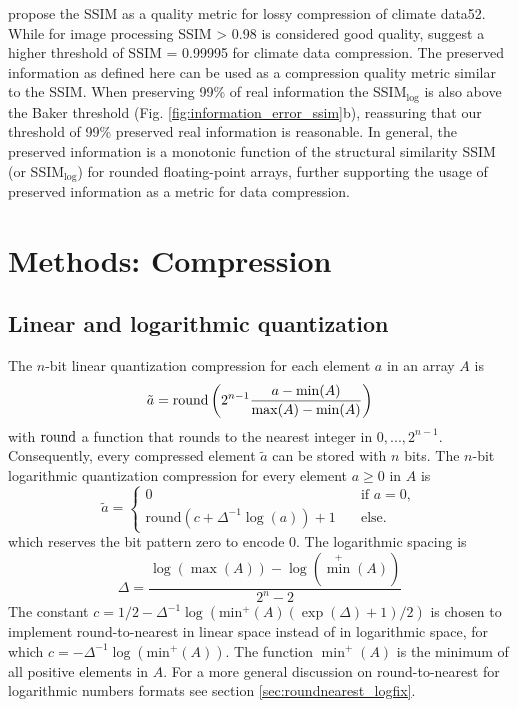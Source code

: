 \cite{Baker2019} propose the SSIM as a quality metric for lossy compression of climate data52. While for image processing
SSIM > 0.98 is considered good quality, \cite{Baker2019} suggest a higher threshold of SSIM = 0.99995 for climate data compression.
The preserved information as defined here can be used as a compression quality metric similar to the SSIM. When preserving 99\%
of real information the SSIM$_{\log}$ is also above the Baker threshold (Fig. \ref{fig:information_error_ssim}b), reassuring that our
threshold of 99\% preserved real information is reasonable. In general, the preserved information is a monotonic function of the
structural similarity SSIM (or SSIM$_{\log}$) for rounded floating-point arrays, further supporting the usage of preserved
information as a metric for data compression. 

\section{Methods: Compression}
\label{sec:compression_methods_compression}

\subsection{Linear and logarithmic quantization}

The $n$-bit linear quantization compression for each element $a$ in an array $A$ is
	\begin{equation}
	\tilde{a} = \operatorname{round} \left( 2^{n-1} \frac{a - \min(A)}{\max(A) - \min(A)} \right)
	\end{equation}
with $\operatorname{round}$ a function that rounds to the nearest integer in $0,...,2^{n-1}$. Consequently, every compressed element $\tilde{a}$
can be stored with $n$ bits. The $n$-bit logarithmic quantization compression for every element $a\geq0$ in $A$ is
	\begin{equation}
	\tilde{a} = \begin{cases} 0 \quad &\text{if } a = 0, \\
	\text{round}\left( c + \Delta^{-1}\log(a) \right) + 1 \quad &\text{else.} \end{cases}
	\end{equation}
which reserves the bit pattern zero to encode 0. The logarithmic spacing is
	\begin{equation}
	\Delta = \frac{\log(\max(A)) - \log(\min^+(A))}{2^{n}-2}
	\end{equation}
The constant $c = 1/2 - \Delta^{-1}\log(\text{min}^+(A)(\exp(\Delta)+1)/2)$ is chosen to implement round-to-nearest in linear space
instead of in logarithmic space, for which $c=-\Delta^{-1}\log(\text{min}^+(A))$. The function $\min^+(A)$  is the minimum of all
positive elements in $A$. For a more general discussion on round-to-nearest for logarithmic numbers formats see section
\ref{sec:roundnearest_logfix}.

